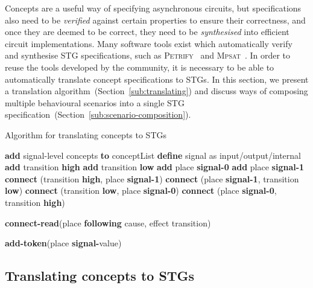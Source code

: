 \documentclass[british, journal]{IEEEtran}
\newcommand{\noun}[1]{\textsc{#1}}
\begin{document}
Concepts are a useful way of specifying asynchronous circuits, but
specifications also need to be \emph{verified} against certain properties to ensure
their correctness, and once they are deemed to be correct, they need to
be \emph{synthesised} into efficient circuit implementations. Many software
tools exist which automatically verify and synthesise STG specifications,
such as \noun{Petrify}~\cite{Cortadella} and \noun{Mpsat}~\cite{khomenko2004detecting}.
In order to reuse the tools developed by the community, it is
necessary to be able to automatically translate concept specifications to STGs.
In this section, we present a translation algorithm~(Section~\ref{sub:translating})
and discuss ways of composing multiple behavioural scenarios into a single STG specification~(Section~\ref{sub:scenario-composition}).

\begin{algorithm}[t]
\begin{algorithmic}
\caption{Algorithm for translating concepts to STGs\label{alg:translation}}
  \State \textbf{add} signal-level concepts \textbf{to} conceptList
\EndFor
  \State \textbf{define} signal as input/output/internal
  \State \textbf{add} transition \textbf{high}
  \State \textbf{add} transition \textbf{low}
  \State \textbf{add} place \textbf{signal-0}
  \State \textbf{add} place \textbf{signal-1}
  \State \textbf{connect} (transition \textbf{high}, place \textbf{signal-1})
  \State \textbf{connect} (place \textbf{signal-1}, transition \textbf{low})
  \State \textbf{connect} (transition \textbf{low}, place \textbf{signal-0})
  \State \textbf{connect} (place \textbf{signal-0}, transition \textbf{high})
\EndFor

  \State \textbf{connect-read}(place \textbf{following} cause, effect transition)
\EndFor

  \State \textbf{add-token}(place \textbf{signal-}value)
\EndFor

\end{algorithmic}
\end{algorithm}

\vspace{-2mm}
\subsection{Translating concepts to STGs\label{sub:translating}}
\end{document}
